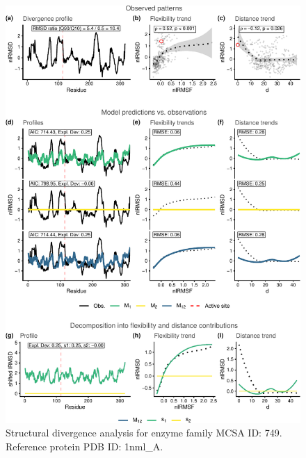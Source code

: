 \documentclass[
]{article}
\begin{document}
\clearpage
\begin{figure}[H]
\centering


\begin{center}\includegraphics{supplementary_material_files/figure-latex/generate_figures-28} \end{center}

\caption{Structural divergence analysis for enzyme family MCSA ID: 749. Reference protein PDB ID: 1nml\_A.}
\end{figure}
\end{document}
